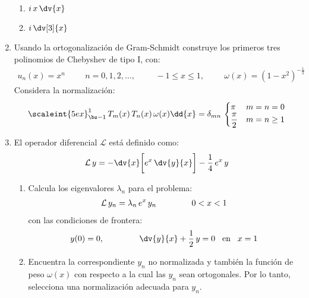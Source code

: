 \begin{enumerate}
\begin{multicols}{2}
\begin{enumerate}[label=\alph*)]
\item $\displaystyle i \, x \, \dv{x}$
\item $\displaystyle i \, \dv[3]{x}$
\end{enumerate}
\end{multicols}
\item Usando la ortogonalización de Gram-Schmidt construye los primeros tres polinomios de Chebyshev de tipo I, con:
\begin{align*}
u_{n} (x) = x^{n} \hspace{1cm} n = 0, 1, 2, \ldots, \hspace{1cm} -1 \leq x \leq 1, \hspace{1cm} \omega(x) = (1 - x^{2})^{-\frac{1}{2}}
\end{align*}
Considera la normalización:
\begin{align*}
\scaleint{5ex}_{\bs -1}^{1} \, T_{m}(x) \, T_{n}(x) \, \omega(x) \dd{x} = \delta_{mn} \, \begin{cases}
\pi & m = n = 0 \\
\dfrac{\pi}{2} & m = n \geq 1
\end{cases}
\end{align*}
\item El operador diferencial $\mathcal{L}$ está definido como:
\begin{align*}
\mathcal{L} \, y = - \dv{x} \bigg[ e^{x} \, \dv{y}{x} \bigg] - \dfrac{1}{4} \, e^{x} \, y
\end{align*}
\begin{enumerate}[label=\roman*)]
\item Calcula los eigenvalores $\lambda_{n}$ para el problema:
\begin{align*}
\mathcal{L} \, y_{n} = \lambda_{n} \, e^{x} \, y_{n} \hspace{1.5cm} 0 < x < 1
\end{align*}
con las condiciones de frontera:
\begin{align*}
y (0) = 0, \hspace{1.5cm} \dv{y}{x} + \dfrac{1}{2} \, y = 0 \hspace{0.3cm} \mbox{en} \hspace{0.3cm} x = 1
\end{align*}
\item Encuentra la correspondiente $y_{n}$ no normalizada y también la función de peso $\omega (x)$ con respecto a la cual las $y_{n}$ sean ortogonales. Por lo tanto, selecciona una normalización adecuada para $y_{n}$.
\end{enumerate}
\end{enumerate}




